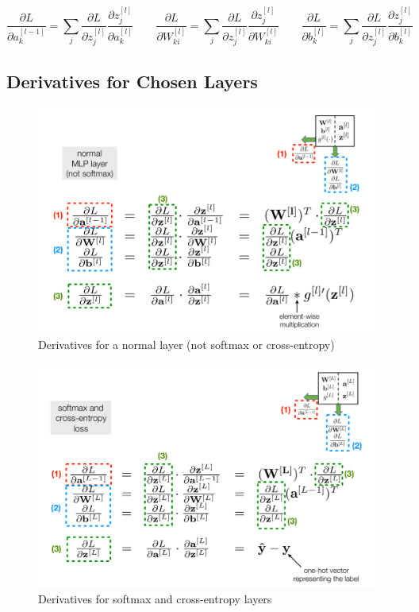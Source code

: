 \documentclass[11pt]{article}
\begin{document}
\begin{equation*}
	\frac{\partial L}{\partial a_k^{[l-1]}} = \sum_{j}\frac{\partial L}{\partial z_j^{[l]}}\frac{\partial z_j^{[l]}}{\partial a_k^{[l]}} \qquad \frac{\partial L}{\partial W_{ki}^{[l]}} = \sum_{j}\frac{\partial L}{\partial z_j^{[l]}}\frac{\partial z_j^{[l]}}{\partial W_{ki}^{[l]}}\qquad\frac{\partial L}{\partial b_k^{[l]}} = \sum_{j}\frac{\partial L}{\partial z_j^{[l]}}\frac{\partial z_j^{[l]}}{\partial b_k^{[l]}}
\end{equation*}

\subsection{Derivatives for Chosen Layers}
\begin{figure}[H]
	\centering
	\includegraphics[width=0.8\linewidth, keepaspectratio]{normal_layer_derivatives}
	\caption{Derivatives for a normal layer (not softmax or cross-entropy)}
	\label{fig:normallayerderivatives}
\end{figure}

\begin{figure}[H]
	\centering
	\includegraphics[width=0.8\linewidth, keepaspectratio]{output_layer_derivatives}
	\caption{Derivatives for softmax and cross-entropy layers}
	\label{fig:outputlayerderivatives}
\end{figure}
\end{document}

